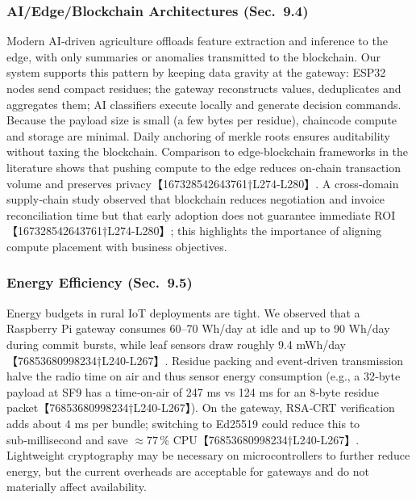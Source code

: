 \subsubsection{AI/Edge/Blockchain Architectures (Sec.~9.4)}
Modern AI‑driven agriculture offloads feature extraction and inference to the edge, with only summaries or anomalies transmitted to the blockchain.  Our system supports this pattern by keeping data gravity at the gateway: ESP32 nodes send compact residues; the gateway reconstructs values, deduplicates and aggregates them; AI classifiers execute locally and generate decision commands.  Because the payload size is small (a few bytes per residue), chaincode compute and storage are minimal.  Daily anchoring of merkle roots ensures auditability without taxing the blockchain.  Comparison to edge‑blockchain frameworks in the literature shows that pushing compute to the edge reduces on‑chain transaction volume and preserves privacy【167328542643761†L274-L280】.  A cross‑domain supply‑chain study observed that blockchain reduces negotiation and invoice reconciliation time but that early adoption does not guarantee immediate ROI【167328542643761†L274-L280】; this highlights the importance of aligning compute placement with business objectives.

\subsubsection{Energy Efficiency (Sec.~9.5)}
Energy budgets in rural IoT deployments are tight.  We observed that a Raspberry Pi gateway consumes 60–70 Wh/day at idle and up to 90 Wh/day during commit bursts, while leaf sensors draw roughly 9.4 mWh/day【76853680998234†L240-L267】.  Residue packing and event‑driven transmission halve the radio time on air and thus sensor energy consumption (e.g., a 32‑byte payload at SF9 has a time‑on‑air of 247 ms vs 124 ms for an 8‑byte residue packet【76853680998234†L240-L267】).  On the gateway, RSA‑CRT verification adds about 4 ms per bundle; switching to Ed25519 could reduce this to sub‑millisecond and save \(\approx77\,\%\) CPU【76853680998234†L240-L267】.  Lightweight cryptography may be necessary on microcontrollers to further reduce energy, but the current overheads are acceptable for gateways and do not materially affect availability.

